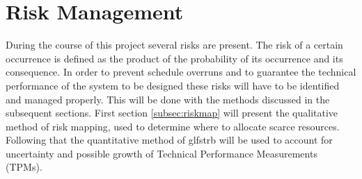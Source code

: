 \section{Risk Management}\label{cha:plan}
During the course of this project several risks are present. The risk of a certain occurrence is defined as the product of the probability of its occurrence and its consequence. In order to prevent schedule overruns and to guarantee the technical performance of the system to be designed these risks will have to be identified and managed properly. This will be done with the methods discussed in the subsequent sections. First section \ref{subsec:riskmap} will present the qualitative method of risk mapping, used to determine where to allocate scarce resources. Following that the quantitative method of glfs{trb} will be used to account for uncertainty and possible growth of Technical Performance Measurements (TPMs).

